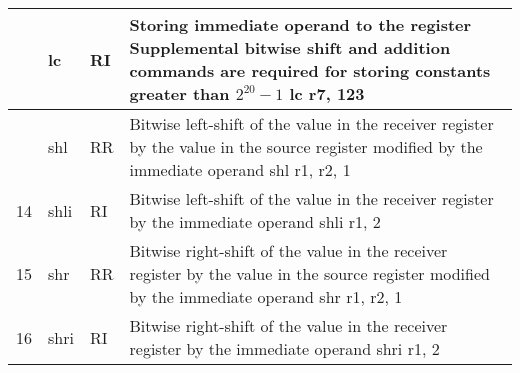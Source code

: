 \documentclass{article}
\newcommand{\St}[1]{{\fontfamily{qcr}\selectfont #1}}
\newcommand{\Ss}[1]{{\fontfamily{cmss}\selectfont #1}}
\begin{document}
\newpage

{
\renewcommand{\arraystretch}{1.4}
\begin{table*}[h!]
\centering
\vspace{2mm}
\centering
\begin{tabular}{| >{\centering\arraybackslash} m{1cm} | >{\centering\arraybackslash} m{1.4cm} | >{\centering\arraybackslash} m{1.2cm} | m{11.6cm} |} 
	
 \hline
 
 12 & \St{lc} & \Ss{RI} &
 
 Storing immediate operand to the register \newline
 Supplemental bitwise shift and addition commands are required for storing \newline
 constants greater than $2^{20} - 1$ \newline
 \St{lc r7, 123} \\
 
 \hline
 
 13 & \St{shl} & \Ss{RR} &
 
 Bitwise left-shift of the value in the receiver register by the value \newline
 in the source register modified by the immediate operand \newline
 \St{shl r1, r2, 1} \\
 
 \hline
 
 14 & \St{shli} & \Ss{RI} &
 
 Bitwise left-shift of the value in the receiver register by \newline
 the immediate operand \newline
 \St{shli r1, 2} \\
 
 \hline
 
 15 & \St{shr} & \Ss{RR} &
 
 Bitwise right-shift of the value in the receiver register by the value \newline
 in the source register modified by the immediate operand \newline
 \St{shr r1, r2, 1} \\
 
 \hline
 
 16 & \St{shri} & \Ss{RI} &
 
 Bitwise right-shift of the value in the receiver register by \newline
 the immediate operand \newline
 \St{shri r1, 2} \\
 

\end{tabular}
\end{table*}}
\end{document}
